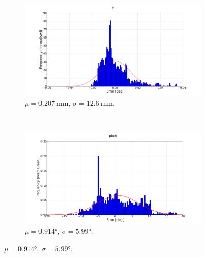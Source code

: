 \begin{figure}
  \begin{subfigure}{0.48\textwidth}
     \includegraphics[clip, trim = 120 0 120 0, width=\textwidth]{figures/chapter3/norm_y}
     \caption{$\mu = \SI{0.207}{\mm}$, $\sigma = \SI{12.6}{\mm}$.}
  \label{fig:norm-y}
  \end{subfigure}
~
  \begin{subfigure}{0.48\textwidth}
     \includegraphics[clip, trim = 120 0 120 0, width=\textwidth]{figures/chapter3/norm_pitch}
     \caption{$\mu = \ang{0.914}$, $\sigma = \ang{5.99}$.}
  \label{fig:norm-pitch}
  \end{subfigure}


\end{figure}
